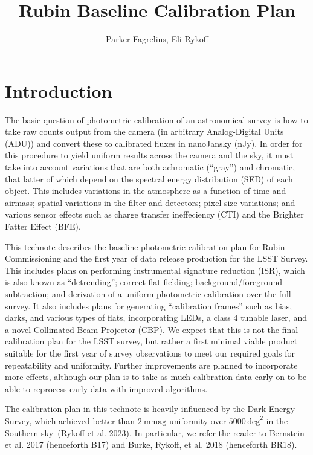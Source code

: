 \documentclass[SE,authoryear,lsstdraft,toc]{lsstdoc}
\title{Rubin Baseline Calibration Plan}
\author{%
Parker Fagrelius, Eli Rykoff
}
\date{\vcsDate}
\begin{document}
\maketitle


\section{Introduction}

The basic question of photometric calibration of an astronomical survey is how
to take raw counts output from the camera (in arbitrary Analog-Digital Units
(ADU)) and convert these to calibrated fluxes in nanoJansky (nJy).  In order
for this procedure to yield uniform results across the camera and the sky, it
must take into account variations that are both achromatic (``gray'') and
chromatic, that latter of which depend on the spectral energy distribution (SED) of each
object.  This includes variations in the atmosphere as a function of time and
airmass; spatial variations in the filter and detectors; pixel size variations;
and various sensor effects such as charge transfer ineffeciency (CTI) and the
Brighter Fatter Effect (BFE).

This technote describes the baseline photometric calibration plan for Rubin
Commissioning and the first year of data release production for the LSST
Survey.  This includes plans on performing instrumental signature reduction
(ISR), which is also known as ``detrending''; correct flat-fielding;
background/foreground subtraction; and derivation of a uniform photometric
calibration over the full survey.  It also includes plans for generating
``calibration frames'' such as bias, darks, and various types of flats,
incorporating LEDs, a class 4 tunable laser, and a novel Collimated Beam
Projector (CBP).  We expect that this is not the final calibration plan for the
LSST survey, but rather a first minimal viable product suitable for the first
year of survey observations to meet our required goals for repeatability and
uniformity.  Further improvements are planned to incorporate more effects,
although our plan is to take as much calibration data early on to be able to
reprocess early data with improved algorithms.

The calibration plan in this technote is heavily influenced by the Dark Energy
Survey, which achieved better than $2~\mathrm{mmag}$ uniformity over
$5000\,\mathrm{deg}^2$ in the Southern sky~(Rykoff et al. 2023).  In
particular, we refer the reader to Bernstein et al. 2017 (henceforth B17) and
Burke, Rykoff, et al. 2018 (henceforth BR18).
\end{document}
